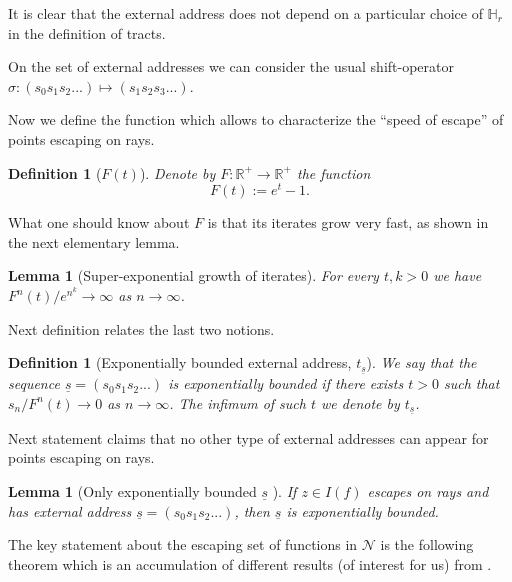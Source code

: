 \documentclass[10pt,reqno,a4paper]{amsart}
\numberwithin{figure}{section}
\numberwithin{equation}{section}
\newtheorem{defn}[thm]{Definition}
\newtheorem{lmm}[thm]{Lemma}
\begin{document}
It is clear that the external address does not depend on a particular choice of $\mathbb{H}_r$ in the definition of tracts.

On the set of external addresses we can consider the usual shift-operator $\sigma:(s_0 s_1 s_2 ... )\mapsto (s_1 s_2 s_3 ... )$.

Now we define the function which allows to characterize the ``speed of escape'' of points escaping on rays.

\begin{defn}[$F(t)$]
	Denote by $F:\mathbb{R^+}\to\mathbb{R^+}$ the function $$F(t):=e^t-1.$$
\end{defn}

What one should know about $F$ is that its iterates grow very fast, as shown in the next elementary lemma.

\begin{lmm}[Super-exponential growth of iterates]
	For every $t,k>0$ we have $F^n(t)/e^{n^k}\to\infty$ as $n\to\infty$.
\end{lmm}

Next definition relates the last two notions.

\begin{defn}[Exponentially bounded external address, $t_{\underline{s}}$]
	\label{dfn:exp_bdd_address}
	We say that the sequence $\underline{s}=(s_0 s_1 s_2 ... )$ is \emph{exponentially bounded} if there exists $t>0$ such that $s_n/{F^n(t)}\to 0$ as $n\to\infty$. The infimum of such $t$ we denote by $t_{\underline{s}}$.	
\end{defn}

Next statement claims that no other type of external addresses can appear for points escaping on rays.

\begin{lmm}[Only exponentially bounded $\underline{s}$ \cite{SZ-Escaping}]
	\label{lmm:only_exp_bdd}
	If $z\in I(f)$ escapes on rays and has external address $\underline{s}=(s_0 s_1 s_2 ... )$, then $\underline{s}$ is exponentially bounded.	
\end{lmm}

The key statement about the escaping set of functions in $\mathcal{N}$ is the following theorem which is an accumulation of different results (of interest for us) from \cite{SZ-Escaping}.
\end{document}
